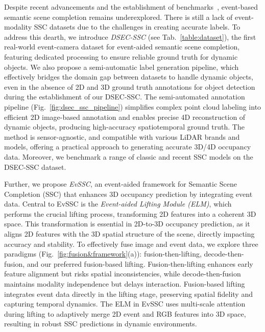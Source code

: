 Despite recent advancements and the establishment of benchmarks~\cite{behley2019semantickitti,pan2020semanticposs,tian2024occ3d,wang2023openoccupancy,tong2023scene_as_occupancy},
%
event-based semantic scene completion remains underexplored. There is still a lack of event-modality SSC datasets due to the challenges in creating accurate labels. 
To address this dearth, we introduce \emph{DSEC-SSC} (see Tab.~\ref{table:dataset}), the first real-world event-camera dataset for event-aided semantic scene completion, featuring dedicated processing to ensure reliable ground truth for dynamic objects. 
We also propose a semi-automatic label generation pipeline, which effectively bridges the domain gap between datasets to handle dynamic objects, even in the absence of 2D and 3D ground truth annotations for object detection during the establishment of our DSEC-SSC. 
The semi-automated annotation pipeline (Fig.~\ref{fig:dsec_ssc_pipeline}) simplifies complex point cloud labeling into efficient 2D image-based annotation and enables precise 4D reconstruction of dynamic objects, producing high-accuracy spatiotemporal ground truth. The method is sensor-agnostic, and compatible with various LiDAR brands and models, offering a practical approach to generating accurate 3D/4D occupancy data. 
Moreover, we benchmark a range of classic and recent SSC models on the DSEC-SSC dataset.

%

Further, we propose \emph{EvSSC}, an event-aided framework for Semantic Scene Completion (SSC) that enhances 3D occupancy prediction by integrating event data. 
Central to EvSSC is the \emph{Event-aided Lifting Module (ELM)}, which performs the crucial lifting process, transforming 2D features into a coherent 3D space. 
This transformation is essential in 2D-to-3D occupancy prediction, as it aligns 2D features with the 3D spatial structure of the scene, directly impacting accuracy and stability.
To effectively fuse image and event data, we explore three paradigms (Fig.~\ref{fig:fusion&framework}(a)): fusion-then-lifting, decode-then-fusion, and our preferred fusion-based lifting. Fusion-then-lifting enhances early feature alignment but risks spatial inconsistencies, while decode-then-fusion maintains modality independence but delays interaction. 
Fusion-based lifting integrates event data directly in the lifting stage, preserving spatial fidelity and capturing temporal dynamics.
The ELM in EvSSC uses multi-scale attention during lifting to adaptively merge 2D event and RGB features into 3D space, resulting in robust SSC predictions in dynamic environments.

